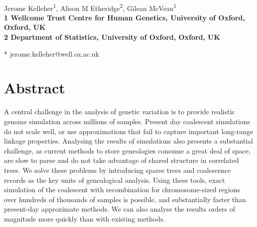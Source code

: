 \documentclass[10pt,letterpaper]{article}
\date{}
\begin{document}
\vspace*{0.35in}

\begin{flushleft}
{\Large
\textbf{}
}
\newline
\\
Jerome Kelleher\textsuperscript{1},
Alison M Etheridge\textsuperscript{2},
Gilean McVean\textsuperscript{1}
\\
\bigskip
\bf{1} Wellcome Trust Centre for Human Genetics, University of Oxford, Oxford, UK
\\
\bf{2} Department of Statistics, University of Oxford, Oxford, UK
\\
\bigskip

* jerome.kelleher@well.ox.ac.uk

\end{flushleft}

\section*{Abstract}
A central challenge in the analysis of genetic variation is to
provide realistic genome simulation across millions of samples. Present day
coalescent simulations do not scale well, or use approximations that fail to
capture important long-range linkage properties. Analysing the results of
simulations also presents a substantial challenge, as current methods to store
genealogies consume a great deal of space, are slow to parse and do not
take advantage of shared structure in correlated trees. We solve these problems
by introducing sparse trees and coalescence records as the key units of
genealogical analysis. Using these tools, exact simulation of the coalescent
with recombination for chromosome-sized regions over hundreds of thousands of
samples is possible, and substantially faster than present-day approximate
methods. We can also analyse the results orders of magnitude more quickly than
with existing methods.

\end{document}
